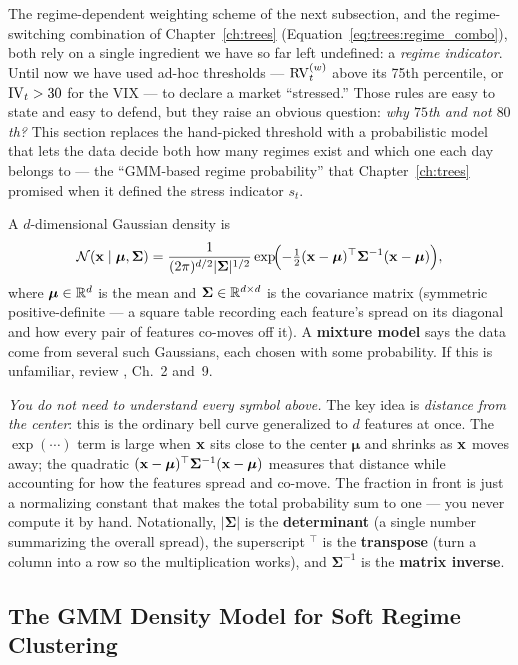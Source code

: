 The regime-dependent weighting scheme of the next subsection, and the
regime-switching combination of Chapter~\ref{ch:trees}
(Equation~\eqref{eq:trees:regime_combo}), both rely on a single ingredient
we have so far left undefined: a \emph{regime indicator}.  Until now we
have used ad-hoc thresholds --- $\operatorname{RV}_t^{(w)}$ above its 75th percentile,
or $\operatorname{IV}_t > 30$ for the VIX --- to declare a market ``stressed.''  Those
rules are easy to state and easy to defend, but they raise an obvious
question: \emph{why $75$th and not $80$th?}  This section replaces the
hand-picked threshold with a probabilistic model that lets the data decide
both how many regimes exist and which one each day belongs to --- the
``GMM-based regime probability'' that Chapter~\ref{ch:trees} promised when
it defined the stress indicator $s_t$.

\begin{prereq}
A $d$-dimensional Gaussian density is
\[
  \mathcal{N}(\mathbf{x} \mid \bm{\mu}, \bm{\Sigma})
  = \frac{1}{(2\pi)^{d/2} |\bm{\Sigma}|^{1/2}}
    \exp\!\Bigl(-\tfrac{1}{2}(\mathbf{x} - \bm{\mu})^\top \bm{\Sigma}^{-1}
    (\mathbf{x} - \bm{\mu})\Bigr),
\]
where $\bm{\mu} \in \mathbb{R}^d$ is the mean and
$\bm{\Sigma} \in \mathbb{R}^{d \times d}$ is the covariance matrix (symmetric
positive-definite --- a square table recording each feature's spread on
its diagonal and how every pair of features co-moves off it).  A
\textbf{mixture model} says the data come from several such Gaussians,
each chosen with some probability.  If this is unfamiliar, review
\citet{Bishop2006}, Ch.~2 and~9.

\medskip
\textit{You do not need to understand every symbol above.} The key idea is
\emph{distance from the center}: this is the ordinary bell curve
generalized to $d$ features at once. The $\exp(\cdots)$ term is large when
$\mathbf{x}$ sits close to the center $\bm{\mu}$ and shrinks as $\mathbf{x}$ moves away;
the quadratic $(\mathbf{x}-\bm{\mu})^\top \bm{\Sigma}^{-1}(\mathbf{x}-\bm{\mu})$ measures
that distance while accounting for how the features spread and co-move. The
fraction in front is just a normalizing constant that makes the total
probability sum to one --- you never compute it by hand. Notationally,
$|\bm{\Sigma}|$ is the \textbf{determinant} (a single number summarizing
the overall spread), the superscript $^\top$ is the \textbf{transpose}
(turn a column into a row so the multiplication works), and
$\bm{\Sigma}^{-1}$ is the \textbf{matrix inverse}.
\end{prereq}

\subsection{The GMM Density Model for Soft Regime Clustering}
\label{sec:hybrid:gmm}


